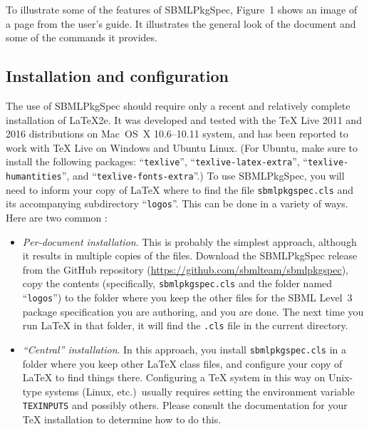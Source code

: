 \documentclass{bmcart}
\newcommand{\sbmlpkg}{SBMLPkgSpec}
\newcommand{\sbmlpkgfile}{\texttt{sbmlpkgspec.cls}}
\newcommand{\githuburl}{https://github.com/sbmlteam/sbmlpkgspec}
\providecommand{\DIFaddtex}[1]{\protect\cbstart{#1}\protect\cbend} %
\providecommand{\DIFdeltex}[1]{\protect\cbdelete} %
\providecommand{\DIFaddbegin}{} %
\providecommand{\DIFaddend}{} %
\providecommand{\DIFdelbegin}{} %
\providecommand{\DIFdelend}{} %
\providecommand{\DIFadd}[1]{\texorpdfstring{\DIFaddtex{#1}}{#1}} %
\providecommand{\DIFdel}[1]{\texorpdfstring{\DIFdeltex{#1}}{}} %
\newcommand{\DIFscaledelfig}{0.5}
\newlength{\DIFdelgraphicswidth} %
\newlength{\DIFdelgraphicsheight} %
\newcommand{\DIFaddincludegraphics}[2][]{{\color{blue}\fbox{\DIFOincludegraphics[#1]{#2}}}} %
\newcommand{\DIFdelincludegraphics}[2][]{%
\sbox{\DIFdelgraphicsbox}{\DIFOincludegraphics[#1]{#2}}%
\settoboxwidth{\DIFdelgraphicswidth}{\DIFdelgraphicsbox} %
\settoboxtotalheight{\DIFdelgraphicsheight}{\DIFdelgraphicsbox} %
\scalebox{\DIFscaledelfig}{%
\parbox[b]{\DIFdelgraphicswidth}{\usebox{\DIFdelgraphicsbox}\\[-\baselineskip] \rule{\DIFdelgraphicswidth}{0em}}\llap{\resizebox{\DIFdelgraphicswidth}{\DIFdelgraphicsheight}{%
\setlength{\unitlength}{\DIFdelgraphicswidth}%
\begin{picture}(1,1)%
\thicklines\linethickness{2pt} %
{\color[rgb]{1,0,0}\put(0,0){\framebox(1,1){}}}%
{\color[rgb]{1,0,0}\put(0,0){\line( 1,1){1}}}%
{\color[rgb]{1,0,0}\put(0,1){\line(1,-1){1}}}%
\end{picture}%
}\hspace*{3pt}}} %
} %
\DeclareRobustCommand{\DIFaddbegin}{\DIFOaddbegin \let\includegraphics\DIFaddincludegraphics} %
\DeclareRobustCommand{\DIFaddend}{\DIFOaddend \let\includegraphics\DIFOincludegraphics} %
\DeclareRobustCommand{\DIFdelbegin}{\DIFOdelbegin \let\includegraphics\DIFdelincludegraphics} %
\DeclareRobustCommand{\DIFdelend}{\DIFOaddend \let\includegraphics\DIFOincludegraphics} %
\begin{document}
To illustrate some of the features of \sbmlpkg{}, Figure~1 shows an image of a page from the user's guide.  It illustrates the general look of the document and some of the commands it provides.


\subsection*{Installation and configuration}

The use of \sbmlpkg{} should require only a recent and relatively complete installation of LaTeX2e.  It was developed and tested with the TeX Live 2011 and 2016 distributions on Mac~OS~X 10.6--10.11 system, and has been reported to work with TeX Live on Windows and Ubuntu Linux.  (For Ubuntu, make sure to install the following packages: ``\texttt{texlive}'', ``\texttt{texlive-latex-extra}'', ``\texttt{texlive-humantities}'', and ``\texttt{texlive-fonts-extra}''.)  To use \sbmlpkg, you will need to inform your copy of LaTeX where to find the file \sbmlpkgfile{} and its accompanying subdirectory ``\texttt{logos}''.  This can be done in a variety of ways.  Here are two common \DIFdelbegin \DIFdel{ones}\DIFdelend \DIFaddbegin \DIFadd{approaches}\DIFaddend :

\begin{itemize}

\item \emph{Per-document installation}.  This is probably the simplest approach, although it results in multiple copies of the files.  Download the \sbmlpkg{} release from the GitHub repository (\url{\githuburl}), copy the contents (specifically, \sbmlpkgfile{} and the folder named ``\texttt{logos}'') to the folder where you keep the other files for the SBML Level~3 package specification you are authoring, and you are done.  The next time you run LaTeX in that folder, it will find the \texttt{.cls} file in the current directory\DIFdelbegin \DIFdel{and be on its merry way}\DIFdelend .

\item \emph{``Central'' installation}.  In this approach, you install \sbmlpkgfile{} in a folder where you keep other LaTeX class files, and configure your copy of LaTeX to find things there.  Configuring a TeX system in this way on Unix-type systems (Linux, etc.)\ usually requires setting the environment variable \texttt{TEXINPUTS} and possibly others.  Please consult the documentation for your TeX installation to determine how to do this.

\end{itemize}
\end{document}
